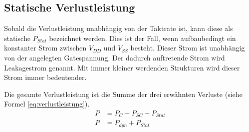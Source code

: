 \subsection{Statische Verlustleistung}\label{subsec:statVerl}
Sobald die Verlustleistung unabhängig von der Taktrate ist, kann diese als statische \(P_{Stat}\) bezeichnet werden. Dies ist der Fall, wenn aufbaubedingt ein konstanter Strom zwischen \(V_{DD}\) und \(V_{SS}\) besteht. Dieser Strom ist unabhängig von der angelegten Gatespannung. Der dadurch auftretende Strom wird Leakagestrom genannt. Mit immer kleiner werdenden Strukturen wird dieser Strom immer bedeutender. \cite[Seite 8]{flynn2007low}

Die gesamte Verlustleistung ist die Summe der drei erwähnten Verluste (siehe Formel \ref{eq:verlustleistung}).
\begin{equation}
\begin{aligned}
P &= P_{ C }+P_{ SC }+P_{ Stat}\\
P &= P_{dyn}+P_{Stat}
\label{eq:verlustleistung}
\end{aligned}
\end{equation}

